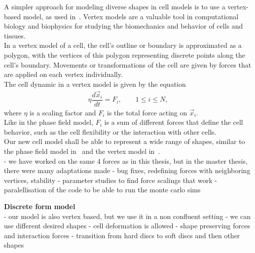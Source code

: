 
A simpler approach for modeling diverse shapes in cell models is to use a vertex-based model, as used in~\cite{Fletcher14}. 
Vertex models are a valuable tool in computational biology and biophysics for studying the biomechanics and behavior of cells and tissues. \\
In a vertex model of a cell, the cell's outline or boundary is approximated as a polygon, with the vertices of this polygon representing discrete points along the cell's boundary. 
Movements or transformations of the cell are given by forces that are applied on each vertex individually. \\
The cell dynamic in a vertex model is given by the equation
\begin{align}
	\eta \dfrac{d \vec{x}_i}{dt} = F_i, \qquad 1 \leq i \leq N \label{eq:vertexmodel}, 
\end{align}
where $\eta$ is a scaling factor and $F_i$ is the total force acting on $\vec{x}_i$. \\
Like in the phase field model, $F_i$ is a sum of different forces that define the cell behavior, such as the cell flexibility or the interaction with other cells. \\
Our new cell model shall be able to represent a wide range of shapes, similar to the phase field model in~\cite{Happel2023} and the vertex model in~\cite{Fletcher14}. \\
- we have worked on the same 4 forces as in this thesis, but in the master thesis, there were many adaptations made 
- bug fixes, redefining forces with neighboring vertices, stability 
- parameter studies to find force scalings that work
- paralellisation of the code to be able to run the monte carlo sims  



\textbf{Discrete form model} \\ 
- our model is also vertex based, but we use it in a non confluent setting
- we can use different desired shapes
- cell deformation is allowed 
- shape preserving forces and interaction forces 
- transition from hard discs to soft discs and then other shapes 

